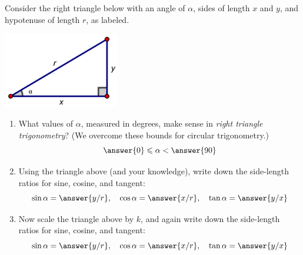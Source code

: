 \documentclass[nooutcomes]{ximera}
\begin{document}
\begin{problem}
Consider the right triangle below with an angle of $\alpha$, sides of length $x$ and $y$, and hypotenuse of length $r$, as labeled.  
\begin{image}
\includegraphics[width=2in]{rightTriangle.png}
\end{image}
\begin{enumerate}
\item What values of $\alpha$, measured in degrees, make sense in \emph{right triangle trigonometry}?  (We overcome these bounds for circular trigonometry.)
\[
\answer{0} \le \alpha < \answer{90}
\]  
\item Using the triangle above (and your knowledge), write down the side-length ratios for sine, cosine, and tangent:  
\[
\sin\alpha = \answer{y/r}, \quad
 \cos\alpha = \answer{x/r}, \quad
  \tan\alpha = \answer{y/x}
\]
\item Now scale the triangle above by $k$, and again write down the side-length ratios for sine, cosine, and tangent:  
\[
\sin\alpha = \answer{y/r}, \quad
 \cos\alpha = \answer{x/r}, \quad
  \tan\alpha = \answer{y/x}
\]
\end{enumerate}
\end{problem}
\end{document}
